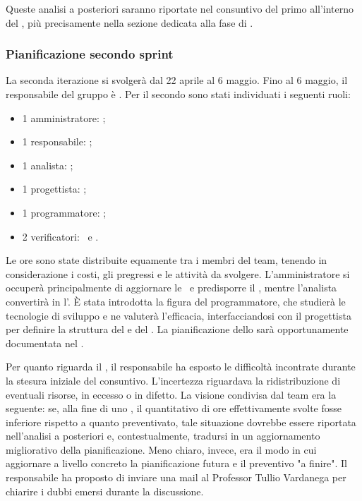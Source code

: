 \vspace{0.5\baselineskip}
\par Queste analisi a posteriori saranno riportate nel consuntivo del primo  all'interno del \PdP, più precisamente nella sezione dedicata alla fase di .

\subsubsection{Pianificazione secondo sprint}
\par La seconda iterazione si svolgerà dal 22 aprile al 6 maggio. Fino al 6 maggio, il
responsabile del gruppo è \raul. Per il secondo  sono stati individuati i seguenti ruoli:
\begin{itemize}
	\item 1 amministratore: \riccardo;
	\item 1 responsabile: \raul;
	\item 1 analista: \tommaso;
	\item 1 progettista: \sebastiano;
  \item 1 programmatore: \marco;
	\item 2 verificatori: \mattia\ e \martina.
\end{itemize}

\vspace{0.5\baselineskip}
\par Le ore sono state distribuite equamente tra i membri del team, tenendo in considerazione i costi, gli  pregressi e le attività da svolgere. L'amministratore si occuperà principalmente di aggiornare le \NdP\ e predisporre il \PdQ, mentre l'analista convertirà in  l'\AdR. È stata introdotta la figura del programmatore, che studierà le tecnologie di sviluppo e ne valuterà l'efficacia, interfacciandosi con il progettista per definire la struttura del  e del . La pianificazione dello  sarà opportunamente documentata nel \PdP. 
\par Per quanto riguarda il \PdP, il responsabile ha esposto le difficoltà incontrate durante la stesura iniziale del consuntivo. L'incertezza riguardava la ridistribuzione di eventuali risorse, in eccesso o in difetto. La visione condivisa dal team era la seguente: se, alla fine di uno , il quantitativo di ore effettivamente svolte fosse inferiore rispetto a quanto preventivato, tale situazione dovrebbe essere riportata nell'analisi a posteriori e, contestualmente, tradursi in un aggiornamento migliorativo della pianificazione. Meno chiaro, invece, era il modo in cui aggiornare a livello concreto la pianificazione futura e il preventivo "a finire". Il responsabile ha proposto di inviare una mail al Professor Tullio Vardanega per chiarire i dubbi emersi durante la discussione.

